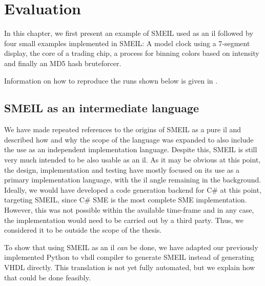 \chapter{Evaluation}
\label{eval}

In this chapter, we first present an example of SMEIL used as an \gls{il}
followed by four small examples implemented in SMEIL: A model clock using a
7-segment display, the core of a trading chip, a process for binning colors
based on intensity and finally an MD5 hash bruteforcer.

Information on how to reproduce the runs shown below is given in
.


\section{SMEIL as an intermediate language}
\label{sec:smeilil}
We have made repeated references to the origins of SMEIL as a pure \gls{il} and
described how and why the scope of the language was expanded to also include the
use as an independent implementation language. Despite this, SMEIL is still very
much intended to be also usable as an \gls{il}. As it may be obvious at this
point, the design, implementation and testing have mostly focused on its use as
a primary implementation language, with the \gls{il} angle remaining in the
background. Ideally, we would have developed a code generation backend for C\#
at this point, targeting SMEIL, since C\# SME is the most complete SME
implementation. %
However, this was not possible within the available time-frame and in any case,
the implementation would need to be carried out by a third party. Thus, we
considered it to be outside the scope of the thesis.

To show that using SMEIL as an \gls{il} {\itshape can} be done, we have adapted
our previously implemented Python to \gls{vhdl} compiler to generate SMEIL
instead of generating VHDL directly. This translation is not yet fully
automated, but we explain how that could be done feasibly.

